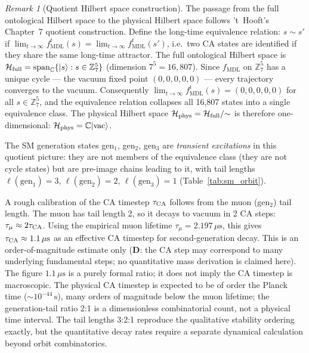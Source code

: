\documentclass[11pt]{article}
\theoremstyle{remark}
\newtheorem{remark}[theorem]{Remark}
\newcommand{\MDL}{\text{MDL}}
\newcommand{\CatD}{\textbf{D}}
\newcommand{\ket}[1]{|{#1}\rangle}
\begin{document}
\begin{remark}[Quotient Hilbert space construction]\label{rem:quotient}
The passage from the full ontological Hilbert space to the physical Hilbert space
follows 't~Hooft's Chapter~7 quotient construction.
Define the long-time equivalence relation: $s \sim s'$ if $\lim_{t\to\infty}
f_{\MDL}^t(s) = \lim_{t\to\infty} f_{\MDL}^t(s')$, i.e.\ two CA states are
identified if they share the same long-time attractor.
The full ontological Hilbert space is $\mathcal{H}_{\rm full} =
\mathrm{span}_{\mathbb{C}}\{\ket{s} : s \in \mathbb{Z}_7^5\}$ (dimension $7^5 =
16{,}807$).
Since $f_{\MDL}$ on $\mathbb{Z}_7^5$ has a unique cycle --- the vacuum fixed point
$(0,0,0,0,0)$ --- every trajectory converges to the vacuum.
Consequently $\lim_{t\to\infty} f_{\MDL}^t(s) = (0,0,0,0,0)$ for all $s \in
\mathbb{Z}_7^5$, and the equivalence relation collapses all 16{,}807 states into a
single equivalence class.
The physical Hilbert space $\mathcal{H}_{\rm phys} = \mathcal{H}_{\rm full}/{\sim}$
is therefore one-dimensional: $\mathcal{H}_{\rm phys} = \mathbb{C}\ket{\mathrm{vac}}$.

The SM generation states gen$_1$, gen$_2$, gen$_3$ are \emph{transient excitations}
in this quotient picture: they are not members of the equivalence class (they are
not cycle states) but are pre-image chains leading to it, with tail lengths
$\ell(\mathrm{gen}_1) = 3$, $\ell(\mathrm{gen}_2) = 2$, $\ell(\mathrm{gen}_3) = 1$
(Table~\ref{tab:sm_orbit}).

A rough calibration of the CA timestep $\tau_{\rm CA}$ follows from the muon (gen$_2$)
tail length.
The muon has tail length 2, so it decays to vacuum in 2 CA steps:
$\tau_{\mu} \approx 2\tau_{\rm CA}$.
Using the empirical muon lifetime $\tau_{\mu} = 2.197\,\mu\text{s}$, this gives
$\tau_{\rm CA} \approx 1.1\,\mu\text{s}$ as an effective CA timestep for
second-generation decay.
This is an order-of-magnitude estimate only (\CatD{}: the CA step may correspond to
many underlying fundamental steps; no quantitative mass derivation is claimed here).
The figure $1.1\,\mu\text{s}$ is a purely formal ratio; it does not imply the CA
timestep is macroscopic.  The physical CA timestep is expected to be of order the
Planck time (${\sim}10^{-44}\,\text{s}$), many orders of magnitude below the muon
lifetime; the generation-tail ratio 2:1 is a dimensionless combinatorial count,
not a physical time interval.
The tail lengths 3:2:1 reproduce the qualitative stability ordering exactly, but the
quantitative decay rates require a separate dynamical calculation beyond orbit
combinatorics.
\end{remark}
\end{document}
